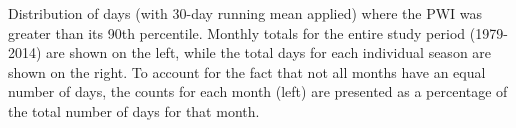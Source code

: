 \label{fig:annual_distribution}
Distribution of days (with 30-day running mean applied) where the PWI was greater than its 90th percentile. Monthly totals for the entire study period (1979-2014) are shown on the left, while the total days for each individual season are shown on the right. To account for the fact that not all months have an equal number of days, the counts for each month (left) are presented as a percentage of the total number of days for that month. 
